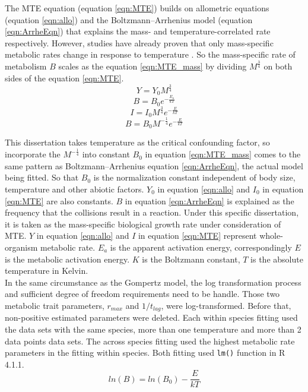 \documentclass[a4paper]{article}
\begin{document}
The MTE equation (equation \ref{eqn:MTE}) builds on allometric equations (equation \ref{eqn:allo}) \citep{kleiber1932body} and the Boltzmann–Arrhenius model (equation \ref{eqn:ArrheEqn}) that explains the mass- and temperature-correlated rate respectively. However, studies have already proven that only mass-specific metabolic rates change in response to temperature \citep{schramski2015metabolic}. So the mass-specific rate of metabolism $B$ scales as the equation \ref{eqn:MTE_mass} by dividing $M^{\frac{3}{4}}$ on both sides of the equation \ref{eqn:MTE}. \\
\begin{equation}
    \label{eqn:allo}
    Y = Y_0 M^{\frac{3}{4}}
\end{equation}
\begin{equation}
    \label{eqn:ArrheEqn}
    B = B_0 e^{-\frac{E_a}{k T}}
\end{equation}
\begin{equation}
    \label{eqn:MTE}
    I = I_0 M^{\frac{3}{4}} e^{-\frac{E}{k T}}
\end{equation}
\begin{equation}
    \label{eqn:MTE_mass}
    B = B_0 M^{-\frac{1}{4}} e^{-\frac{E}{k T}}
\end{equation}

This dissertation takes temperature as the critical confounding factor, so incorporate the $ M^{-\frac{1}{4}} $ into constant $B_0$ in equation \ref{eqn:MTE_mass} comes to the same pattern as Boltzmann–Arrhenius equation \ref{eqn:ArrheEqn}, the actual model being fitted. So that $B_0$ is the normalization constant independent of body size, temperature and other abiotic factors. $Y_0$ in equation \ref{eqn:allo} and $I_0$ in equation \ref{eqn:MTE} are also constants. $B$ in equation \ref{eqn:ArrheEqn} is explained as the frequency that the collisions result in a reaction. Under this specific dissertation, it is taken as the mass-specific biological growth rate under consideration of MTE. $Y$ in equation \ref{eqn:allo} and $I$ in equation \ref{eqn:MTE} represent whole-organism metabolic rate.  $E_a$ is the apparent activation energy, correspondingly $E$ is the metabolic activation energy. $K$ is the Boltzmann constant, $T$ is the absolute temperature in Kelvin. \\

In the same circumstance as the Gompertz model, the log transformation process and sufficient degree of freedom requirements need to be handle. Those two metabolic trait parameters, $r_{max}$ and $1/t_{lag}$, were log-transformed. Before that, non-positive estimated parameters were deleted. Each within species fitting used the data sets with the same species, more than one temperature and more than 2 data points data sets. The across species fitting used the highest metabolic rate parameters in the fitting within species. Both fitting used \texttt{lm()} function in R 4.1.1. \\
\begin{equation}
    \label{eqn:logArrheEqn}
    ln(B) = ln(B_0) - \frac{E}{k T}
\end{equation}
\end{document}
